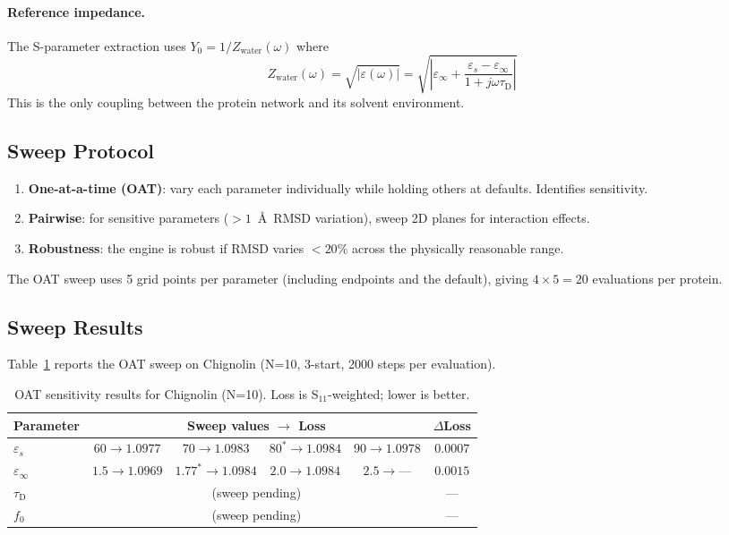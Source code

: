 \paragraph{Reference impedance.}
The S-parameter extraction uses
$Y_0 = 1/Z_\text{water}(\omega)$ where
\begin{equation}
    Z_\text{water}(\omega)
    = \sqrt{|\varepsilon(\omega)|}
    = \sqrt{\left|\varepsilon_\infty
      + \frac{\varepsilon_s - \varepsilon_\infty}
             {1 + j\omega\tau_\text{D}}\right|}
    \label{eq:z_water}
\end{equation}
This is the only coupling between the protein network and its
solvent environment.

\subsection{Sweep Protocol}

\begin{enumerate}
\item \textbf{One-at-a-time (OAT)}: vary each parameter individually
      while holding others at defaults.  Identifies sensitivity.
\item \textbf{Pairwise}: for sensitive parameters ($>1$~\AA\ RMSD
      variation), sweep 2D planes for interaction effects.
\item \textbf{Robustness}: the engine is robust if RMSD varies
      $<20\%$ across the physically reasonable range.
\end{enumerate}

The OAT sweep uses 5 grid points per parameter (including endpoints
and the default), giving $4 \times 5 = 20$ evaluations per protein.

\subsection{Sweep Results}

Table~\ref{tab:env_sweep_results} reports the OAT sweep on Chignolin
(N=10, 3-start, 2000 steps per evaluation).

\begin{table}[H]
\centering
\caption{OAT sensitivity results for Chignolin (N=10).
         Loss is S$_{11}$-weighted; lower is better.}
\label{tab:env_sweep_results}
\begin{tabular}{l c c c c c}
\toprule
Parameter & \multicolumn{4}{c}{Sweep values $\to$ Loss} & $\Delta$Loss \\
\midrule
$\varepsilon_s$ & $60 \to 1.0977$ & $70 \to 1.0983$
    & $80^* \to 1.0984$ & $90 \to 1.0978$ & $\mathbf{0.0007}$ \\
$\varepsilon_\infty$ & $1.5 \to 1.0969$ & $1.77^* \to 1.0984$
    & $2.0 \to 1.0984$ & $2.5 \to \text{---}$ & $\mathbf{0.0015}$ \\
$\tau_\text{D}$ & \multicolumn{4}{c}{(sweep pending)} & --- \\
$f_0$         & \multicolumn{4}{c}{(sweep pending)} & --- \\
\bottomrule
\end{tabular}
\end{table}

